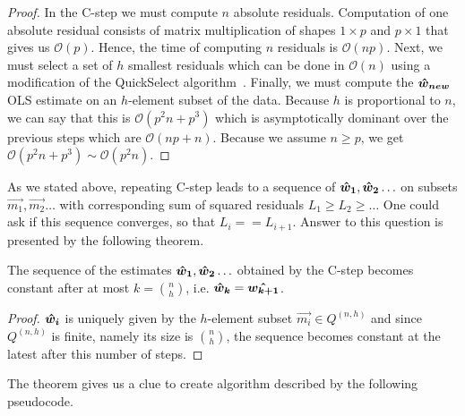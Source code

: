 \begin{proof}
    In the C-step we must compute $n$ absolute residuals. Computation of one absolute residual consists of
    matrix multiplication of shapes $1 \times p$ and $p \times 1$ that gives us $\mathcal{O}(p)$. Hence, the time of computing $n$ residuals is $\mathcal{O}(np)$.
    Next, we must select a set of $h$ smallest residuals which can be done in $\mathcal{O}(n)$ using a modification of the QuickSelect algorithm~\cite{hoare1961algorithm}.
    Finally, we must compute the $\boldsymbol{\hat{w}_{new}}$ OLS estimate on an $h$-element subset of the data. Because $h$ is proportional to $n$, we can say that this is $\mathcal{O}(p^2n + p^3)$ which is asymptotically dominant over the previous steps which are $\mathcal{O}(np + n)$. Because we assume $n \ge p$, we get $\mathcal{O}(p^2n + p^3) \sim \mathcal{O}(p^2n) $.
\end{proof}

As we stated above, repeating C-step leads to a sequence of $\boldsymbol{\hat{w}_1}, \boldsymbol{\hat{w}_2} \ldots$ 
on subsets $\vec{m_1}, \vec{m_2} \ldots$ with corresponding sum of squared residuals 
$L_1 \geq L_2\geq \ldots$ One could ask if this sequence converges, so that $L_i == L_{i+1}$. 
Answer to this question is presented by the following theorem.




\begin{theorem}
    The sequence of the estimates $\boldsymbol{\hat{w}_1}, \boldsymbol{\hat{w}_2} \ldots$ obtained by the C-step becomes constant after at most $k = {n \choose h}$, i.e. $\boldsymbol{\hat{w}_k} = \boldsymbol{\hat{w_{k+1}}}$.
\end{theorem}

\begin{proof}
    $\boldsymbol{\hat{w}_{i}}$  is uniquely given by  the $h$-element subset $\vec{m_i} \in Q^{(n, h)}$ and since $Q^{(n, h)}$ is finite,  namely its size is ${n \choose h}$, the sequence becomes constant at the latest after this number of steps.
\end{proof}



The theorem gives us a clue to create algorithm described by the following pseudocode.

